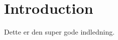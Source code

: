 \chapter{Introduction}\label{ch:Indledning}
Dette er den super gode indledning.\cite{website:Eksempel}